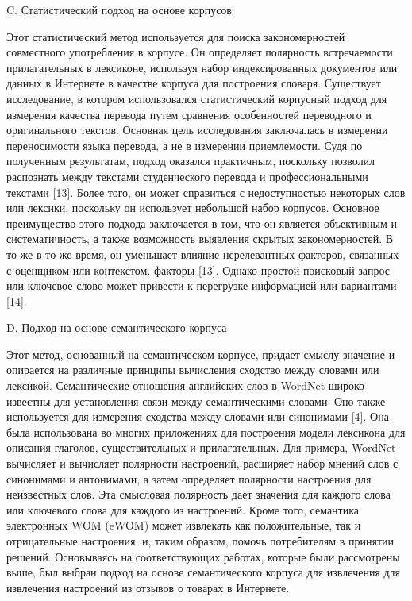 C. Статистический подход на основе корпусов

Этот статистический метод используется для поиска закономерностей совместного
употребления в корпусе. Он определяет полярность встречаемости прилагательных в
лексиконе, используя набор индексированных документов или данных в Интернете в
качестве корпуса для построения словаря.  Существует исследование, в котором
использовался статистический корпусный подход для измерения качества перевода
путем сравнения особенностей переводного и оригинального текстов. Основная цель
исследования заключалась в измерении переносимости языка перевода, а не в
измерении приемлемости. Судя по полученным результатам, подход оказался
практичным, поскольку позволил распознать между текстами студенческого перевода
и профессиональными текстами [13].  Более того, он может справиться с
недоступностью некоторых слов или лексики, поскольку он использует небольшой
набор корпусов.  Основное преимущество этого подхода заключается в том, что он
является объективным и систематичность, а также возможность выявления скрытых
закономерностей. В то же в то же время, он уменьшает влияние нерелевантных
факторов, связанных с оценщиком или контекстом. факторы [13]. Однако простой
поисковый запрос или ключевое слово может привести к перегрузке информацией или
вариантами [14].~\cite{article20}

D. Подход на основе семантического корпуса

Этот метод, основанный на семантическом корпусе, придает смыслу значение и
опирается на различные принципы вычисления сходство между словами или лексикой.
Семантические отношения английских слов в WordNet широко известны для
установления связи между семантическими словами. Оно также используется для
измерения сходства между словами или синонимами [4]. Она была использована во
многих приложениях для построения модели лексикона для описания глаголов,
существительных и прилагательных. Для примера, WordNet вычисляет и вычисляет
полярности настроений, расширяет набор мнений слов с синонимами и антонимами, а
затем определяет полярности настроения для неизвестных слов. Эта смысловая
полярность дает значения для каждого слова или ключевого слова для каждого из
настроений. Кроме того, семантика электронных WOM (eWOM) может извлекать как
положительные, так и отрицательные настроения. и, таким образом, помочь
потребителям в принятии решений. Основываясь на соответствующих работах, которые
были рассмотрены выше, был выбран подход на основе семантического корпуса для
извлечения для извлечения настроений из отзывов о товарах в Интернете.
~\cite{article20}


